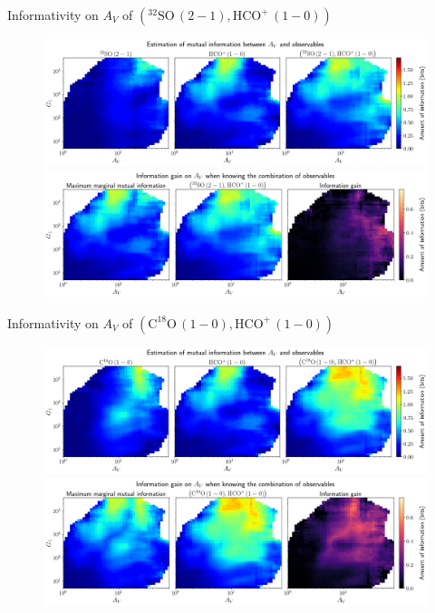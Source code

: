 \documentclass{beamer}
\begin{document}
\begin{frame}{Informativity on $A_V$ of $\left(\mathrm{^{32}SO\,(2-1)},\mathrm{HCO^+\,(1-0)}\right)$}
    \begin{figure}
        \centering
        \includegraphics[width=0.95\linewidth]{../mi/av__32so21_hcop10_mi.png}
        \vfill
        \includegraphics[width=0.95\linewidth]{../mi/av__32so21_hcop10_mi_gain.png}
    \end{figure}
\end{frame}

\begin{frame}{Informativity on $A_V$ of $\left(\mathrm{C^{18}O\,(1-0)},\mathrm{HCO^+\,(1-0)}\right)$}
    \begin{figure}
        \centering
        \includegraphics[width=0.95\linewidth]{../mi/av__c18o10_hcop10_mi.png}
        \vfill
        \includegraphics[width=0.95\linewidth]{../mi/av__c18o10_hcop10_mi_gain.png}
    \end{figure}
\end{frame}
\end{document}
